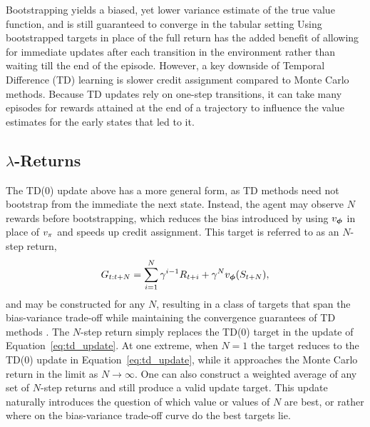   Bootstrapping yields a biased, yet lower variance estimate of the true value function, and is still guaranteed to converge in the tabular setting 
  Using bootstrapped targets in place of the full return has the added benefit of allowing for immediate updates after each transition in the environment rather than waiting till the end of the episode. However, a key downside of Temporal Difference (TD) learning is slower credit assignment compared to Monte Carlo methods. Because TD updates rely on one-step transitions, it can take many episodes for rewards attained at the end of a trajectory to influence the value estimates for the early states that led to it.
  
  \subsection{$\lambda$-Returns}
  The TD(0) update above has a more general form, as TD methods need not bootstrap from the immediate the next state. Instead, the agent may observe $N$ rewards before bootstrapping, which reduces the bias introduced by using $v_{\bm \phi}$ in place of $v_{\pi}$ and speeds up credit assignment. This target is referred to as an $N$-step return,
  \begin{equation}
      G_{t:t+N} = \sum_{i=1}^{N} \gamma^{i-1} R_{t+i} + \gamma^{N} v_{\bm \phi}(S_{t+N}),
      \label{eq:nstep_return}
  \end{equation}
  and may be constructed for any $N$, resulting in a class of targets that span the bias-variance trade-off while maintaining the convergence guarantees of TD methods . The $N$-step return simply replaces the TD(0) target in the update of Equation~\eqref{eq:td_update}.
  At one extreme, when $N = 1$ the target reduces to the TD(0) update in Equation~\eqref{eq:td_update}, while it approaches the Monte Carlo return in the limit as $N \to \infty$. One can also construct a weighted average of any set of $N$-step returns and still produce a valid update target. This update naturally introduces the question of which value or values of $N$ are best, or rather where on the bias-variance trade-off curve do the best targets lie.
  
